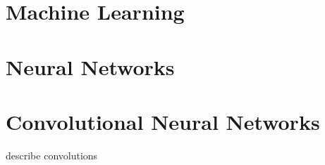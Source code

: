 \section{Machine Learning}
\section{Neural Networks}
\section{Convolutional Neural Networks}
describe convolutions